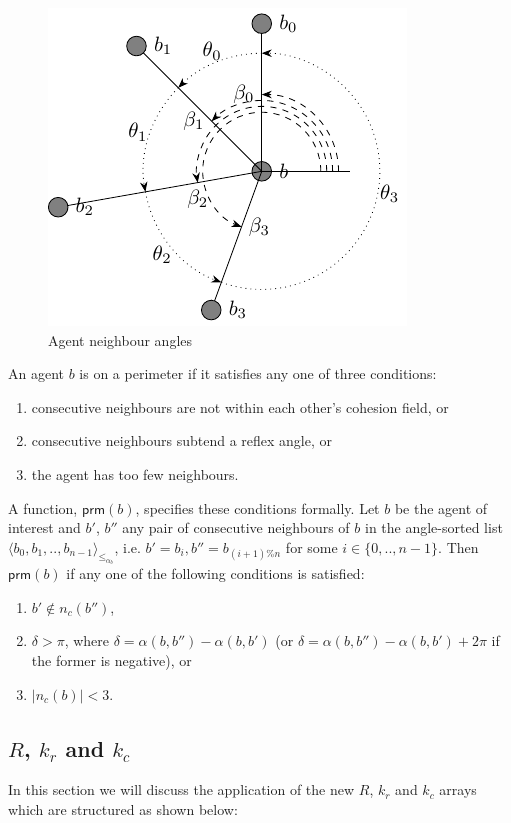 \documentclass[12pt,a4paper]{IEEEtran}
\newcommand{\card}[1]{\vert{#1}\vert}
\newcommand{\pangle}{\mathit{\alpha}}
\newcommand{\leqaz}[3]{#2 \leq_{\pangle_#1} #3}
\newcommand{\angleordered}[2]{\langle #2 \rangle_{\leqaz{#1}{}{}}}
\newcommand{\prm}{\mathsf{prm}}
\newcommand{\kc}{\mathit{k_c}}
\newcommand{\kr}{\mathit{k_r}}
\newcommand{\rb}{\mathit{R}}
\begin{document}
\begin{figure}[H]
	\centering
	\includegraphics[width=0.8\linewidth]{figures/neighbours3}
	\caption[Agent neighbours]{Agent neighbour angles}
	\label{fig:neighbours3}
\end{figure}

An agent $b$ is on a perimeter if it satisfies any one of three conditions:
\begin{enumerate}
	\item consecutive neighbours are not within each other's cohesion field, or
	\item consecutive neighbours subtend a reflex angle, or
	\item the agent has too few neighbours.
\end{enumerate}
A function, $\prm(b)$, specifies these conditions formally. Let $b$ be the
agent of interest and $b'$, $b''$ any pair of consecutive neighbours of $b$ in
the angle-sorted list $\angleordered{b}{b_0, b_1, .., b_{n-1}}$, i.e. $b' =
b_i, b'' = b_{(i+1)\%n}$ for some $i \in \{0,..,n-1\}$.  Then $\prm(b)$ if any
one of the following conditions is satisfied:
\begin{enumerate}
\item $b' \notin n_c(b'')$,
\item $\delta > \pi$, where $\delta = \pangle(b, b'') - \pangle(b, b')$ (or $\delta = \pangle(b, b'') - \pangle(b, b') + 2\pi$ if the former is negative), or
\item $\card{n_c(b)} < 3$.
\end{enumerate}

\subsection{$\rb$, $\kr$ and $\kc$}\label{sec:rbkrkc} 
In this section we will discuss the application of the new $\rb$, $\kr$ and $\kc$ arrays which are structured as shown below:
\end{document}
